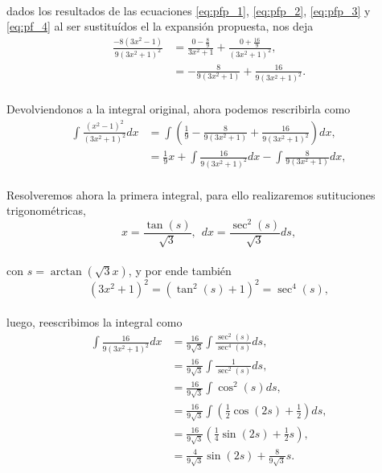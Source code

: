 \documentclass{article}
\begin{document}
\paragraph{} dados los resultados de las ecuaciones \eqref{eq:pfp_1}, \eqref{eq:pfp_2}, \eqref{eq:pfp_3} y \eqref{eq:pf_4} al ser sustituídos el la expansión propuesta, nos deja
\begin{align*}
\frac{-8(3x^2 - 1)}{9(3x^2 + 1)^2} &= \frac{0 - \frac{8}{9}}{3x^2 +1} + \frac{0 + \frac{16}{9}}{(3x^2 + 1)^2},\\
&= - \frac{8}{9(3x^2 + 1)} + \frac{16}{9(3x^2 + 1)^2}.
\end{align*}
\paragraph{} Devolviendonos a la integral original, ahora podemos rescribirla como
\begin{align*}
\int \frac{(x^2 - 1)^2}{(3x^2 + 1)^2} dx &= \int \left(\frac{1}{9} - \frac{8}{9(3x^2 + 1)} + \frac{16}{9(3x^2 + 1)^2} \right)dx,\\
&= \frac{1}{9}x + \int \frac{16}{9(3x^2 + 1)^2} dx - \int \frac{8}{9(3x^2 +1)} dx,
\end{align*}
\paragraph{}Resolveremos ahora la primera integral, para ello realizaremos sutituciones trigonométricas, 
$$x = \frac{\tan{(s)}}{\sqrt{3}}, \hspace{5pt} dx = \frac{\sec^2{(s)}}{\sqrt{3}}ds,$$
\paragraph{} con $s = \arctan{(\sqrt{3}x)}$, y por ende también
$$(3x^2 +1)^2 = (\tan^2{(s)} + 1)^2 = \sec^4{(s)},$$
\paragraph{}luego, reescribimos la integral como
\begin{align*}
\int \frac{16}{9(3x^2 + 1)^2} dx &= \frac{16}{9\sqrt{3}} \int \frac{\sec^2{(s)}}{\sec^4{(s)}}ds,\\
&= \frac{16}{9\sqrt{3}} \int \frac{1}{\sec^2{(s)}}ds,\\
&= \frac{16}{9\sqrt{3}} \int \cos^2{(s)}ds,\\
&= \frac{16}{9\sqrt{3}} \int \left(\frac{1}{2}\cos{(2s) + \frac{1}{2}}\right) ds,\\
&= \frac{16}{9\sqrt{3}} \left(\frac{1}{4}\sin{(2s)} + \frac{1}{2} s\right),\\
&= \frac{4}{9\sqrt{3}} \sin{(2s)} + \frac{8}{9\sqrt{3}}s.
\end{align*}
\end{document}
